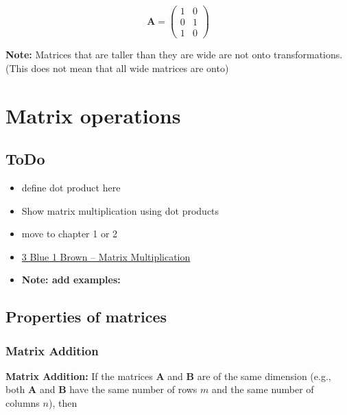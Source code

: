 \documentclass[
]{book}
\theoremstyle{definition}
\theoremstyle{definition}
\theoremstyle{definition}
\theoremstyle{definition}
\theoremstyle{remark}
\begin{document}
\[
\mathbf{A} = \begin{pmatrix}
1 & 0  \\
0 & 1  \\
1 & 0
\end{pmatrix}
\]

\textbf{Note:} Matrices that are taller than they are wide are not onto transformations. (This does not mean that all wide matrices are onto)

\hypertarget{matrix-operations}{%
\chapter{Matrix operations}\label{matrix-operations}}

\hypertarget{todo}{%
\section{ToDo}\label{todo}}

\begin{itemize}
\item
  define dot product here
\item
  Show matrix multiplication using dot products
\item
  move to chapter 1 or 2
\item
  \href{https://www.3blue1brown.com/lessons/matrix-multiplication}{3 Blue 1 Brown -- Matrix Multiplication}
\item
  \textbf{Note: add examples:}
\end{itemize}

\hypertarget{properties-of-matrices}{%
\section{Properties of matrices}\label{properties-of-matrices}}

\hypertarget{matrix-addition}{%
\subsection{Matrix Addition}\label{matrix-addition}}

\textbf{Matrix Addition:} If the matrices \(\mathbf{A}\) and \(\mathbf{B}\) are of the same dimension (e.g., both \(\mathbf{A}\) and \(\mathbf{B}\) have the same number of rows \(m\) and the same number of columns \(n\)), then
\end{document}
